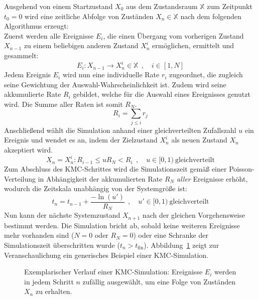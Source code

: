 Ausgehend von einem Startzustand $X_0$ aus dem Zustandsraum $\mathbb{X}$ zum Zeitpunkt $t_0 = 0$ wird eine zeitliche Abfolge von Zuständen $X_n \in \mathbb{X}$ nach dem folgenden Algorithmus erzeugt:\\
Zuerst werden alle Ereignisse $E_i$, die einen Übergang vom vorherigen Zustand $X_{n-1}$ zu einem beliebigen anderen Zustand $X_n^i$ ermöglichen, ermittelt und gesammelt:
\begin{equation}
  E_i : X_{n-1} \rightarrow X_n^i \in \mathbb{X} ~~,\quad i \in [1, N]
\end{equation}
Jedem Ereignis $E_i$ wird nun eine individuelle Rate $r_i$ zugeordnet, die zugleich seine Gewichtung der Auswahl-Wahrscheinlichkeit ist.
Zudem wird seine akkumulierte Rate $R_i$ gebildet, welche für die Auswahl eines Ereignisses genutzt wird.
Die Summe aller Raten ist somit $R_N$.
\begin{equation}
  R_i = \sum_{j \le i}{r_j}
\end{equation}
Anschließend wählt die Simulation anhand einer gleichverteilten Zufallszahl $u$ ein Ereignis und wendet es an, indem der Zielzustand $X_n^i$ als neuen Zustand $X_n$ akzeptiert wird.
\begin{equation}
  X_n = X_n^i : R_{i-1} \le u R_N < R_i ~~,\quad u \in [0,1)~\text{gleichverteilt}
\end{equation}
Zum Abschluss des KMC-Schrittes wird die Simulationszeit gemäß einer Poisson-Verteilung in Abhängigkeit der akkumulierten Rate $R_N$ \textit{aller} Ereignisse erhöht, wodurch die Zeitskala unabhängig von der Systemgröße ist:
\begin{equation}
  t_n = t_{n-1} + \frac{-\ln(u')}{R_N} ~~,\quad u' \in [0,1)~\text{gleichverteilt}
\end{equation}
Nun kann der nächste Systemzustand $X_{n+1}$ nach der gleichen Vorgehensweise bestimmt werden.
Die Simulation bricht ab, sobald keine weiteren Ereignisse mehr vorhanden sind ($N=0$ oder $R_N=0$) oder eine Schranke der Simulationszeit überschritten wurde ($t_n > t_\text{fin}$).
Abbildung~\ref{fig:kmctree} zeigt zur Veranschaulichung ein generisches Beispiel einer KMC-Simulation.

\begin{figure}
  \centering

  \def\svgwidth{14cm}
  

  \caption[Exemplarischer Verlauf einer KMC-Simulation]{
    Exemplarischer Verlauf einer KMC-Simulation:
    Ereignisse $E_i$ werden in jedem Schritt $n$ zufällig ausgewählt, um eine Folge von Zuständen $X_n$ zu erhalten.
  }

  \label{fig:kmctree}
\end{figure}

